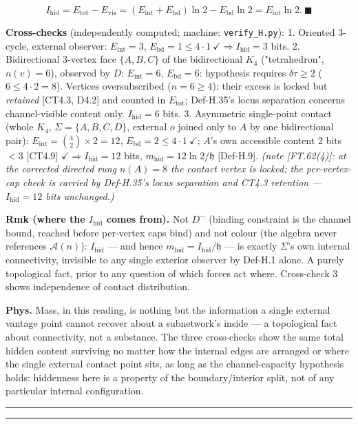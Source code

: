 \begin{theorem}
\[
I_{\mathrm{hid}}=E_{\mathrm{tot}}-E_{\mathrm{vis}}=(E_{\mathrm{int}}+E_{\mathrm{bd}})\ln2-E_{\mathrm{bd}}\ln2=E_{\mathrm{int}}\ln2.\ \blacksquare
\]

\textbf{Cross-checks} (independently computed; machine: \texttt{verify\_\allowbreak{}H.py}): 1. Oriented 3-cycle, external observer: $E_{\mathrm{int}}=3$, $E_{\mathrm{bd}}=1\le4\cdot1\ \checkmark\Rightarrow I_{\mathrm{hid}}=3$ bits. 2. Bidirectional 3-vertex face $\{A,B,C\}$ of the bidirectional $K_4$ ("tetrahedron", $n(v)=6$), observed by $D$: $E_{\mathrm{int}}=6$, $E_{\mathrm{bd}}=6$: hypothesis requires $\delta\tau\ge2$ ($6\le4\cdot2=8$). Vertices oversubscribed ($n=6\ge4$): their excess is locked but \textit{retained} [CT4.3, D4.2] and counted in $E_{\mathrm{tot}}$; Def-H.35's locus separation concerns channel-visible content only. $I_{\mathrm{hid}}=6$ bits. 3. Asymmetric single-point contact (whole $K_4$, $\Sigma=\{A,B,C,D\}$, external $o$ joined only to $A$ by one bidirectional pair): $E_{\mathrm{int}}=\binom42\times2=12$, $E_{\mathrm{bd}}=2\le4\cdot1\ \checkmark$; $A$'s own accessible content 2 bits $<3$ [CT4.9] $\checkmark\Rightarrow I_{\mathrm{hid}}=12$ bits, $m_{\mathrm{hid}}=12\ln2/\mathfrak h$ [Def-H.9]. \textit{(note [FT.62(4)]: at the corrected directed rung $n(A)=8$ the contact vertex is locked; the per-vertex-cap check is carried by Def-H.35's locus separation and CT4.3 retention — $I_{\mathrm{hid}}=12$ bits unchanged.)}

\textbf{Rmk (where the $I_{\mathrm{hid}}$ comes from).} Not $D^-$ (binding constraint is the channel bound, reached before per-vertex caps bind) and not colour (the algebra never references $\mathcal A(n)$): $I_{\mathrm{hid}}$ — and hence $m_{\mathrm{hid}}=I_{\mathrm{hid}}/\mathfrak h$ — is exactly $\Sigma$'s own internal connectivity, invisible to any single exterior observer by Def-H.1 alone. A purely topological fact, prior to any question of which forces act where. Cross-check 3 shows independence of contact distribution.

\textbf{Phys.} Mass, in this reading, is nothing but the information a single external vantage point cannot recover about a subnetwork's inside — a topological fact about connectivity, not a substance. The three cross-checks show the same total hidden content surviving no matter how the internal edges are arranged or where the single external contact point sits, as long as the channel-capacity hypothesis holds: hiddenness here is a property of the boundary/interior split, not of any particular internal configuration.

\vspace{2pt}\noindent\rule{\textwidth}{0.4pt}\vspace{2pt}

\vspace{2pt}\noindent\rule{\textwidth}{0.4pt}\vspace{2pt}

\end{theorem}

